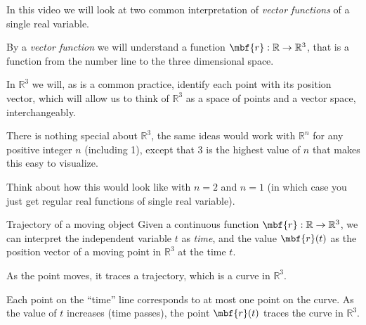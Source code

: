 \documentclass[aspectratio=169]{beamer}
\newcommand{\vect}[1]{\mbf{#1}}
\begin{document}
\begin{frame}
    In this video we will look at two common interpretation of \emph{vector
        functions} of a single real variable.\pause

    By a \emph{vector function} we will understand a function $\vect{r}:
    \mathbb{R}\to\mathbb{R}^3$, that is a function from the number line to the
    three dimensional space.\pause

    In $\mathbb{R}^3$ we will, as is a common practice, identify each point
    with its position vector, which will allow us to think of $\mathbb{R}^3$ as
    a space of points and a vector space, interchangeably. 
\end{frame}
\begin{frame}
    There is nothing special about $\mathbb{R}^3$, the same ideas would work
    with $\mathbb{R}^n$ for any positive integer $n$ (including 1), except that
    3 is the highest value of $n$ that makes this easy to visualize.\pause

    Think about how this would look like with $n=2$ and $n=1$ (in which case
    you just get regular real functions of single real variable).
\end{frame}
\begin{frame}{Trajectory of a moving object}
    Given a continuous function $\vect{r}:\mathbb{R}\to\mathbb{R}^3$, we can
    interpret the independent variable $t$ as \emph{time}, and the value
    $\vect{r}(t)$ as the position vector of a moving point in $\mathbb{R}^3$ at
    the time $t$.\pause

    As the point moves, it traces a trajectory, which is a curve in
    $\mathbb{R}^3$.\pause

    Each point on the ``time'' line corresponds to at most one point on the
    curve.  As the value of $t$ increases (time passes), the point
    $\vect{r}(t)$ traces the curve in $\mathbb{R}^3$.
\end{frame}
\end{document}
